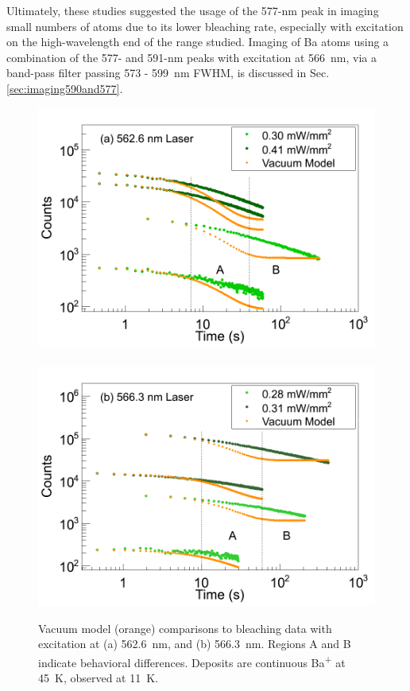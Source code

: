 
Ultimately, these studies suggested the usage of the 577-nm peak in imaging small numbers of atoms due to its lower bleaching rate, especially with excitation on the high-wavelength end of the range studied.  Imaging of Ba atoms using a combination of the 577- and 591-nm peaks with excitation at 566~nm, via a band-pass filter passing 573 - 599~nm FWHM, is discussed in Sec. \ref{sec:imaging590and577}.

\begin{figure} %
        \centering
                \includegraphics[width=.5\textwidth]{figures/bleach_model_vacuum_a_regions.png}
                ~
                \includegraphics[width=.5\textwidth]{figures/bleach_model_vacuum_b_regions.png}
                \caption{Vacuum model (orange) comparisons to bleaching data with excitation at (a) 562.6~nm, and (b) 566.3~nm.  Regions A and B indicate behavioral differences.  Deposits are continuous Ba\textsuperscript{+} at 45~K, observed at 11~K.}
\label{fig:bleach_model_vac}
\end{figure}

